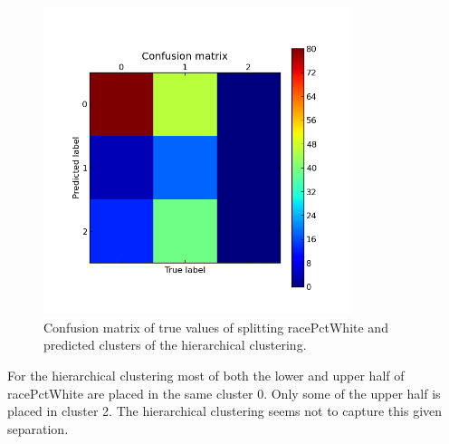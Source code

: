 \documentclass[a4paper,10pt]{article}
\begin{document}
\begin{figure}[h]
\centering
\includegraphics[h, width=0.8\textwidth]{figure_5}
\caption{Confusion matrix of true values of splitting racePctWhite and predicted clusters of the hierarchical clustering.}
\end{figure}
For the hierarchical clustering most of both the lower and upper half of racePctWhite are placed in the same cluster 0. Only some of the upper half is placed in cluster 2. The hierarchical clustering seems not to capture this given separation.
\end{document}
